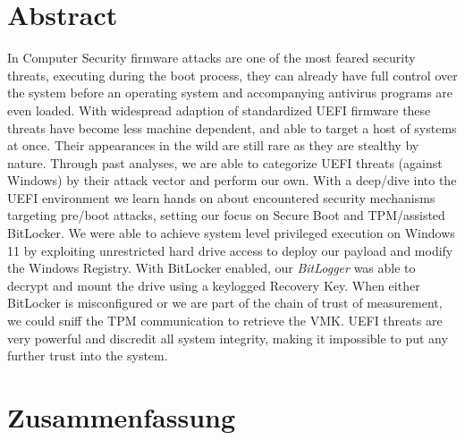

\chapter*{Abstract}
\label{sec:abstract}
\thispagestyle{empty}

In Computer Security firmware attacks are one of the most feared security threats, executing during the boot process, they can already have full control over the system before an operating system and accompanying antivirus programs are even loaded.
With widespread adaption of standardized \acs{UEFI} firmware these threats have become less machine dependent, and able to target a host of systems at once.
Their appearances in the wild are still rare as they are stealthy by nature.
Through past analyses, we are able to categorize \acs{UEFI} threats (against Windows) by their attack vector and perform our own.
With a deep\-/dive into the \acs{UEFI} environment we learn hands on about encountered security mechanisms targeting pre\-/boot attacks, setting our focus on Secure Boot and \acs{TPM}\-/assisted BitLocker.
We were able to achieve system level privileged execution on Windows 11 by exploiting unrestricted hard drive access to deploy our payload and modify the Windows Registry.
With BitLocker enabled, our \emph{BitLogger} was able to decrypt and mount the drive using a keylogged Recovery Key.
When either BitLocker is misconfigured or we are part of the chain of trust of measurement, we could sniff the \acs{TPM} communication to retrieve the \acs{VMK}.
\acs{UEFI} threats are very powerful and discredit all system integrity, making it impossible to put any further trust into the system.

\acresetall

\chapter*{Zusammenfassung}
\thispagestyle{empty}
\label{sec:zusammenfassung}

